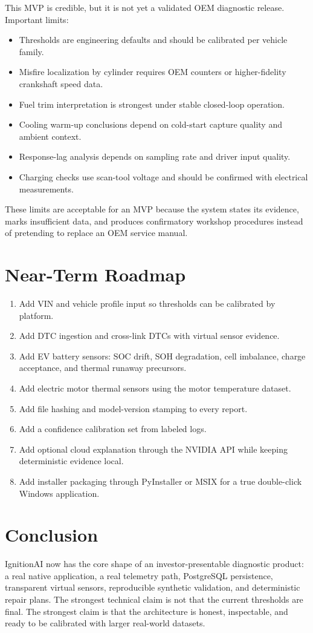 \documentclass[11pt,a4paper]{article}
\begin{document}
This MVP is credible, but it is not yet a validated OEM diagnostic release. Important limits:

\begin{itemize}
\item Thresholds are engineering defaults and should be calibrated per vehicle family.
\item Misfire localization by cylinder requires OEM counters or higher-fidelity crankshaft speed data.
\item Fuel trim interpretation is strongest under stable closed-loop operation.
\item Cooling warm-up conclusions depend on cold-start capture quality and ambient context.
\item Response-lag analysis depends on sampling rate and driver input quality.
\item Charging checks use scan-tool voltage and should be confirmed with electrical measurements.
\end{itemize}

These limits are acceptable for an MVP because the system states its evidence, marks insufficient data, and produces confirmatory workshop procedures instead of pretending to replace an OEM service manual.

\section{Near-Term Roadmap}

\begin{enumerate}
\item Add VIN and vehicle profile input so thresholds can be calibrated by platform.
\item Add DTC ingestion and cross-link DTCs with virtual sensor evidence.
\item Add EV battery sensors: SOC drift, SOH degradation, cell imbalance, charge acceptance, and thermal runaway precursors.
\item Add electric motor thermal sensors using the motor temperature dataset.
\item Add file hashing and model-version stamping to every report.
\item Add a confidence calibration set from labeled logs.
\item Add optional cloud explanation through the NVIDIA API while keeping deterministic evidence local.
\item Add installer packaging through PyInstaller or MSIX for a true double-click Windows application.
\end{enumerate}

\section{Conclusion}

IgnitionAI now has the core shape of an investor-presentable diagnostic product: a real native application, a real telemetry path, PostgreSQL persistence, transparent virtual sensors, reproducible synthetic validation, and deterministic repair plans. The strongest technical claim is not that the current thresholds are final. The strongest claim is that the architecture is honest, inspectable, and ready to be calibrated with larger real-world datasets.
\end{document}

